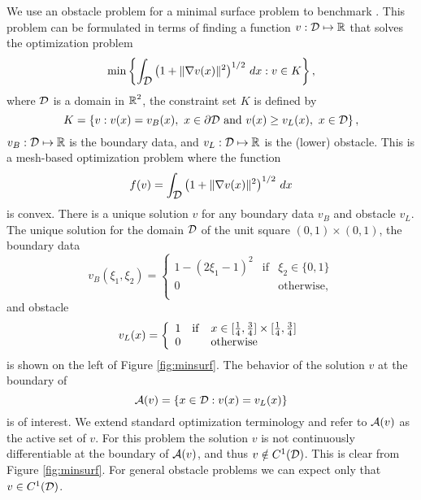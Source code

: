We use an obstacle problem for a minimal surface 
problem to benchmark \tao. This problem can be formulated in terms of
finding a function $ v : \mbox{$\cal D$} \mapsto \mbox{${\mathbb R}$} $ that solves the
optimization problem
\begin{equation}
  \label{eq:minsurf}
\min 
\left \{
\int_{ \mbox{$\cal D$} } \left ( 1 + \| \nabla v (x) \| ^ 2 \right )^{1/2} \, 
  d x : v \in K 
\right \} ,
\end{equation}
where $ \mbox{$\cal D$} $ is a domain in $ \mbox{${\mathbb R}$}^2 $, the constraint set $K$ is defined by
\[
K = \left \{ v : v(x) = v_B (x), \ x \in \partial \mbox{$\cal D$} \mathrm{~and~}
                 v(x) \ge v_L (x) , \ x \in \mbox{$\cal D$} \right \} ,
\]
$ v_B : \mbox{$\cal D$} \mapsto \mbox{${\mathbb R}$} $ is the boundary data, and $ v_L :
\mbox{$\cal D$} \mapsto \mbox{${\mathbb R}$} $ is the (lower) obstacle.  This is a
mesh-based optimization problem where
the function
\begin{equation}
  \label{eq:minsurf_f}
f(v) =
\int_{ \mbox{$\cal D$} } \left ( 1 + \| \nabla v (x) \| ^ 2 \right )^{1/2} \,  d x 
\end{equation}
is convex.  There is a unique solution $v$ for any boundary
data $ v_B $ and obstacle $ v_L $.  The unique solution for
the domain $ \mbox{$\cal D$} $ of
the unit square $ (0,1) \times (0,1) $, the boundary data
\[
v_B( \xi_1 , \xi_2 ) = 
\left \{ 
  \begin{array}{lcl}
  1 - (2 \xi_1 - 1)^2 & \mathrm{if} &  \xi_2 \in \{ 0, 1 \} \\
  0 & & \mathrm{otherwise,} \\
  \end{array}
\right .
\]
and obstacle
\begin{equation}
  \label{eq:obstacle}
v_L(x) = 
\left \{ 
  \begin{array}{lcl}
  1 & \mathrm{if} &  x \in [ {\textstyle{\frac{1}{4}}} , {\textstyle{\frac{3}{4}}} ] \times  [ {\textstyle{\frac{1}{4}}} , {\textstyle{\frac{3}{4}}} ] \\
  0 & & \mathrm{otherwise} \\
  \end{array}
\right .
\end{equation}
is shown on the left of Figure \ref{fig:minsurf}.
The behavior of the solution $v$ at the
boundary of
\[
\mbox{$\cal A$} (v) = \left \{ x \in \mbox{$\cal D$} :  v(x) = v_L(x)  \right \}
\]
is of interest. We extend standard optimization terminology
and refer to $ \mbox{$\cal A$} (v) $ as the active set of $v$.
For this problem  the solution $ v $ is not
continuously differentiable at the boundary
of $ \mbox{$\cal A$} (v) $, and thus $ v \notin C^1 ( \mbox{$\cal D$} ) $.
This is clear from  Figure \ref{fig:minsurf}.
For general obstacle problems \cite{Rodr87} we can
expect only that $ v \in C^1 ( \mbox{$\cal D$} ) $.

